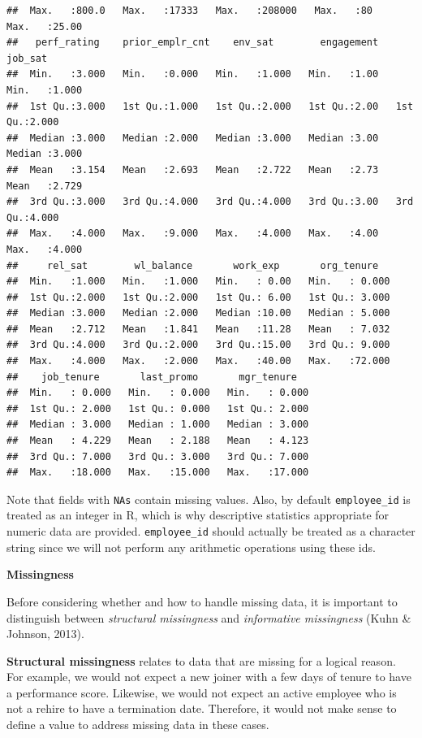 \documentclass[]{book}
\begin{document}
\begin{verbatim}
##  Max.   :800.0   Max.   :17333   Max.   :208000   Max.   :80    Max.   :25.00  
##   perf_rating    prior_emplr_cnt    env_sat        engagement      job_sat     
##  Min.   :3.000   Min.   :0.000   Min.   :1.000   Min.   :1.00   Min.   :1.000  
##  1st Qu.:3.000   1st Qu.:1.000   1st Qu.:2.000   1st Qu.:2.00   1st Qu.:2.000  
##  Median :3.000   Median :2.000   Median :3.000   Median :3.00   Median :3.000  
##  Mean   :3.154   Mean   :2.693   Mean   :2.722   Mean   :2.73   Mean   :2.729  
##  3rd Qu.:3.000   3rd Qu.:4.000   3rd Qu.:4.000   3rd Qu.:3.00   3rd Qu.:4.000  
##  Max.   :4.000   Max.   :9.000   Max.   :4.000   Max.   :4.00   Max.   :4.000  
##     rel_sat        wl_balance       work_exp       org_tenure    
##  Min.   :1.000   Min.   :1.000   Min.   : 0.00   Min.   : 0.000  
##  1st Qu.:2.000   1st Qu.:2.000   1st Qu.: 6.00   1st Qu.: 3.000  
##  Median :3.000   Median :2.000   Median :10.00   Median : 5.000  
##  Mean   :2.712   Mean   :1.841   Mean   :11.28   Mean   : 7.032  
##  3rd Qu.:4.000   3rd Qu.:2.000   3rd Qu.:15.00   3rd Qu.: 9.000  
##  Max.   :4.000   Max.   :2.000   Max.   :40.00   Max.   :72.000  
##    job_tenure       last_promo       mgr_tenure    
##  Min.   : 0.000   Min.   : 0.000   Min.   : 0.000  
##  1st Qu.: 2.000   1st Qu.: 0.000   1st Qu.: 2.000  
##  Median : 3.000   Median : 1.000   Median : 3.000  
##  Mean   : 4.229   Mean   : 2.188   Mean   : 4.123  
##  3rd Qu.: 7.000   3rd Qu.: 3.000   3rd Qu.: 7.000  
##  Max.   :18.000   Max.   :15.000   Max.   :17.000
\end{verbatim}

Note that fields with \texttt{NA\textquotesingle{}s} contain missing values. Also, by default \texttt{employee\_id} is treated as an integer in R, which is why descriptive statistics appropriate for numeric data are provided. \texttt{employee\_id} should actually be treated as a character string since we will not perform any arithmetic operations using these ids.

\textbf{Missingness}

Before considering whether and how to handle missing data, it is important to distinguish between \emph{structural missingness} and \emph{informative missingness} (Kuhn \& Johnson, 2013).

\textbf{Structural missingness} relates to data that are missing for a logical reason. For example, we would not expect a new joiner with a few days of tenure to have a performance score. Likewise, we would not expect an active employee who is not a rehire to have a termination date. Therefore, it would not make sense to define a value to address missing data in these cases.
\end{document}
